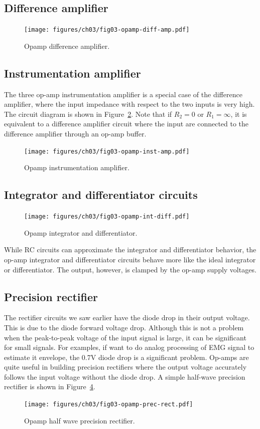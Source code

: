 \subsection{Difference amplifier}
\begin{figure}[htbp]
    \centering
    \texttt{[image: figures/ch03/fig03-opamp-diff-amp.pdf]}
    \caption{Opamp difference amplifier.}
    \label{fig:03-opamp-diff-amp}
\end{figure}

\subsection{Instrumentation amplifier}
The three op-amp instrumentation amplifier is a special case of the difference amplifier, where the input impedance with respect to the two inputs is very high. The circuit diagram is shown in Figure~\ref{fig:03-opamp-inst-amp}. Note that if $R_2 = 0$ or $R_1 = \infty$, it is equivalent to a difference amplifier circuit where the input are connected to the difference amplifier through an op-amp buffer.
\begin{figure}[htbp]
    \centering
    \texttt{[image: figures/ch03/fig03-opamp-inst-amp.pdf]}
    \caption{Opamp instrumentation amplifier.}
    \label{fig:03-opamp-inst-amp}
\end{figure}

\subsection{Integrator and differentiator circuits}
\begin{figure}[htbp]
    \centering
    \texttt{[image: figures/ch03/fig03-opamp-int-diff.pdf]}
    \caption{Opamp integrator and differentiator.}
    \label{fig:03-opamp-int-diff}
\end{figure}
While RC circuits can approximate the integrator and differentiator behavior, the op-amp integrator and differentiator circuits behave more like the ideal integrator or differentiator. The output, however, is clamped by the op-amp supply voltages.

\subsection{Precision rectifier}
The rectifier circuits we saw earlier have the diode drop in their output voltage. This is due to the diode forward voltage drop. Although this is not a problem when the peak-to-peak voltage of the input signal is large, it can be significant for small signals. For examples, if want to do analog processing of EMG signal to estimate it envelope, the 0.7V diode drop is a significant problem. Op-amps are quite useful in building precision rectifiers where the output voltage accurately follows the input voltage without the diode drop. A simple half-wave precision rectifier is shown in Figure~\ref{fig:03-opamp-prec-rec}.
\begin{figure}[htbp]
    \centering
    \texttt{[image: figures/ch03/fig03-opamp-prec-rect.pdf]}
    \caption{Opamp half wave precision rectifier.}
    \label{fig:03-opamp-prec-rec}
\end{figure}

